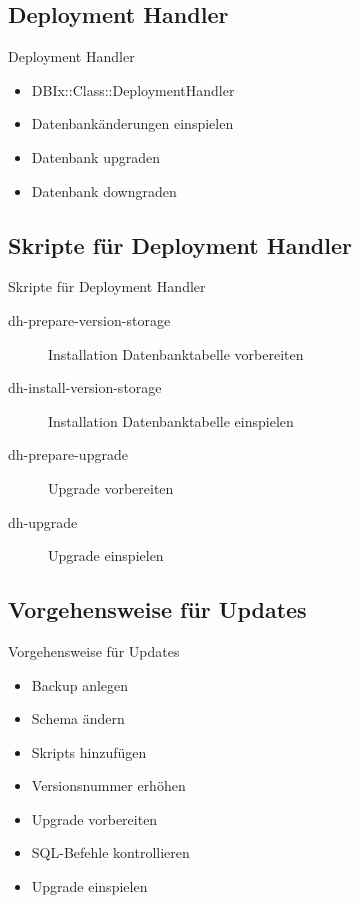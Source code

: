 \subsection{Deployment Handler}

\begin{frame}{Deployment Handler}
\begin{itemize}
\item DBIx::Class::DeploymentHandler
\item Datenbankänderungen einspielen
\item Datenbank upgraden
\item Datenbank downgraden
\end{itemize}
\end{frame}

\subsection{Skripte für Deployment Handler}
\begin{frame}{Skripte für Deployment Handler}
\begin{description}
\item[dh-prepare-version-storage] Installation Datenbanktabelle vorbereiten
\item[dh-install-version-storage] Installation Datenbanktabelle einspielen
\item[dh-prepare-upgrade] Upgrade vorbereiten
\item[dh-upgrade] Upgrade einspielen
\end{description}
\end{frame}

\subsection{Vorgehensweise für Updates}

\begin{frame}{Vorgehensweise für Updates}
\begin{itemize}
\item Backup anlegen
\item Schema ändern
\item Skripts hinzufügen
\item Versionsnummer erhöhen
\item Upgrade vorbereiten
\item SQL-Befehle kontrollieren
\item Upgrade einspielen
\end{itemize}
\end{frame}

